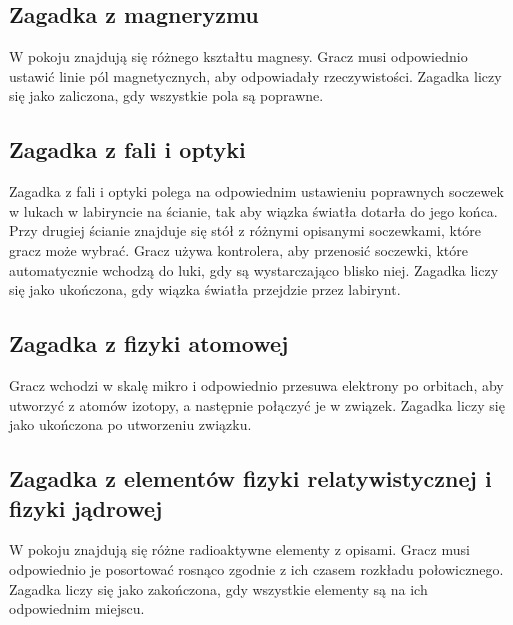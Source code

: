 \subsection{Zagadka z magneryzmu}
W pokoju znajdują się różnego kształtu magnesy. Gracz musi odpowiednio ustawić linie pól magnetycznych, aby odpowiadały rzeczywistości. Zagadka liczy się jako zaliczona, gdy wszystkie pola są poprawne.

\subsection{Zagadka z fali i optyki}
Zagadka z fali i optyki polega na odpowiednim ustawieniu poprawnych soczewek w lukach w labiryncie na ścianie, tak aby wiązka światła dotarła do jego końca. Przy drugiej ścianie znajduje się stół z różnymi opisanymi soczewkami, które gracz może wybrać. Gracz używa kontrolera, aby przenosić soczewki, które automatycznie wchodzą do luki, gdy są wystarczająco blisko niej. Zagadka liczy się jako ukończona, gdy wiązka światła przejdzie przez labirynt.

\subsection{Zagadka z fizyki atomowej}
Gracz wchodzi w skalę mikro i odpowiednio przesuwa elektrony po orbitach, aby utworzyć z atomów izotopy, a następnie połączyć je w związek. Zagadka liczy się jako ukończona po utworzeniu związku.

\subsection{Zagadka z elementów fizyki relatywistycznej i fizyki jądrowej}
W pokoju znajdują się różne radioaktywne elementy z opisami. Gracz musi odpowiednio je posortować rosnąco zgodnie z ich czasem rozkładu połowicznego. Zagadka liczy się jako zakończona, gdy wszystkie elementy są na ich odpowiednim miejscu. 

